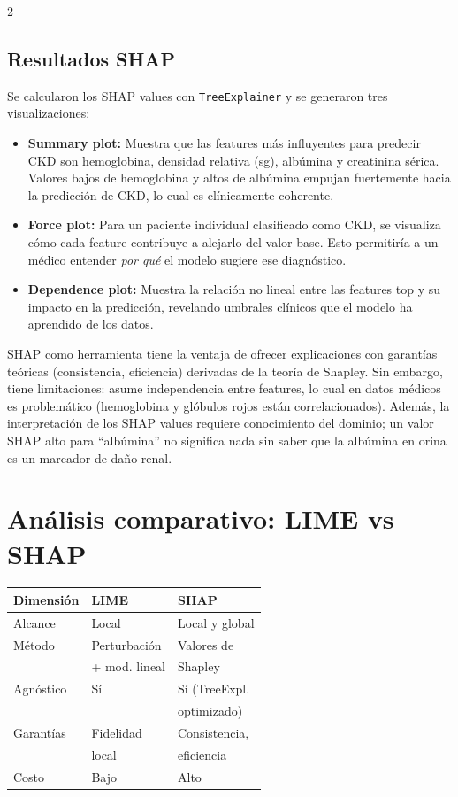 \documentclass[12pt, a4paper]{article}
\begin{document}
\begin{multicols}{2}
\subsection{Resultados SHAP}

Se calcularon los SHAP values con \texttt{TreeExplainer} y se generaron tres visualizaciones:

\begin{itemize}[leftmargin=1.5em, itemsep=2pt]
    \item \textbf{Summary plot:} Muestra que las features más influyentes para predecir CKD son hemoglobina, densidad relativa (sg), albúmina y creatinina sérica. Valores bajos de hemoglobina y altos de albúmina empujan fuertemente hacia la predicción de CKD, lo cual es clínicamente coherente.
    \item \textbf{Force plot:} Para un paciente individual clasificado como CKD, se visualiza cómo cada feature contribuye a alejarlo del valor base. Esto permitiría a un médico entender \textit{por qué} el modelo sugiere ese diagnóstico.
    \item \textbf{Dependence plot:} Muestra la relación no lineal entre las features top y su impacto en la predicción, revelando umbrales clínicos que el modelo ha aprendido de los datos.
\end{itemize}

SHAP como herramienta tiene la ventaja de ofrecer explicaciones con garantías teóricas (consistencia, eficiencia) derivadas de la teoría de Shapley. Sin embargo, tiene limitaciones: asume independencia entre features, lo cual en datos médicos es problemático (hemoglobina y glóbulos rojos están correlacionados). Además, la interpretación de los SHAP values requiere conocimiento del dominio; un valor SHAP alto para ``albúmina'' no significa nada sin saber que la albúmina en orina es un marcador de daño renal.

\section{Análisis comparativo: LIME vs SHAP}

\begin{table}[h!]
\centering
\small
\begin{tabular}{@{}lll@{}}
\toprule
\textbf{Dimensión} & \textbf{LIME} & \textbf{SHAP} \\
\midrule
Alcance & Local & Local y global \\
Método & Perturbación & Valores de \\
 & + mod. lineal & Shapley \\
Agnóstico & Sí & Sí (TreeExpl. \\
 & & optimizado) \\
Garantías & Fidelidad & Consistencia, \\
 & local & eficiencia \\
Costo & Bajo & Alto \\
\bottomrule
\end{tabular}
\end{table}


\end{multicols}
\end{document}
